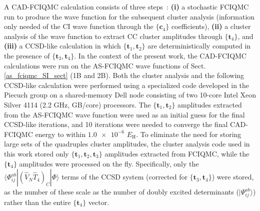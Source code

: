 \documentclass[journal=jcp,manuscript=suppinfo]{achemso}
\begin{document}
A CAD-FCIQMC calculation consists of three steps~\cite{piecuch_monte_carlo_cc_prl_2017,piecuch_monte_carlo_cc_jcp_2018,piecuch_monte_carlo_eom_cc_jcp_2019,piecuch_mg_dimer_sci_adv_2020}: {\bf{(i)}} a stochastic FCIQMC run to produce the wave function for the subsequent cluster analysis (information only needed of the CI wave function through the $\{\bm{c}_4\}$ coefficients), {\bf{(ii)}} a cluster analysis of the wave function to extract CC cluster amplitudes through $\{\bm{t}_4\}$, and {\bf{(iii)}} a CCSD-like calculation in which $\{\bm{t}_1,\bm{t}_2\}$ are deterministically computed in the presence of $\{\bm{t}_3,\bm{t}_4\}$. In the context of the present work, the CAD-FCIQMC calculations were run on the AS-FCIQMC wave functions of Sect. \ref{as_fciqmc_SI_sect} (1B and 2B). Both the cluster analysis and the following CCSD-like calculation were performed using a specialized code developed in the Piecuch group on a shared-memory Dell node consisting of two 10-core Intel Xeon Silver 4114 (2.2 GHz, {\color{red}{XX}} GB/core) processors. The $\{\bm{t}_1,\bm{t}_2\}$ amplitudes extracted from the AS-FCIQMC wave function were used as an initial guess for the final CCSD-like iterations, and 10 iterations were needed to converge the final CAD-FCIQMC energy to within $\num{1.0e-6}$ $E_{\text{H}}$. To eliminate the need for storing large sets of the quadruples cluster amplitudes, the cluster analysis code used in this work stored only $\{\bm{t}_1,\bm{t}_2,\bm{t}_3\}$ amplitudes extracted from FCIQMC, while the $\{\bm{t}_4\}$ amplitudes were processed on the fly. Specifically, only the $\langle \Phi_{ij}^{ab} | (\hat{V}_N \hat{T}_4)_C | \Phi \rangle$ terms of the CCSD system (corrected for $\{\bm{t}_3,\bm{t}_4\}$) were stored, as the number of these scale as the number of doubly excited determinants ($| \Psi_{ij}^{ab} \rangle$) rather than the entire $\{\bm{t}_4\}$ vector.\\
\end{document}
